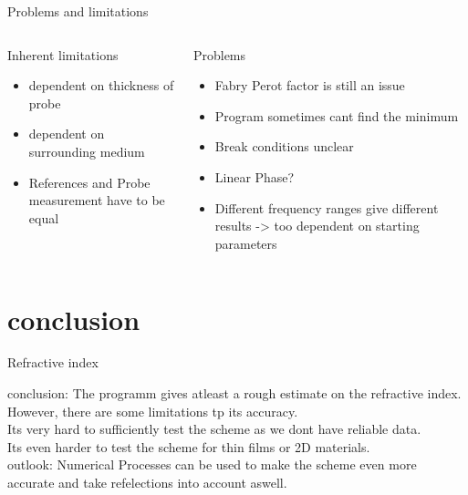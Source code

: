 \documentclass[aspectratio=1610, 9pt]{beamer}
\begin{document}
\begin{frame}{Problems and limitations}
  \begin{columns}
    \begin{column}{0.5\textwidth}
      Inherent limitations
      \begin{itemize}
        \item dependent on thickness of probe
        \item dependent on surrounding medium
        \item References and Probe measurement have to be equal
      \end{itemize}
    \end{column} 
    \begin{column}{0.5\textwidth}
      Problems
      \begin{itemize}
        \item Fabry Perot factor is still an issue
        \item Program sometimes cant find the minimum
        \item Break conditions unclear 
        \item Linear Phase?
        \item Different frequency ranges give different results -> too dependent on starting parameters 
      \end{itemize}
    \end{column}
  \end{columns}
\end{frame}

\section{conclusion}
\begin{frame}{Refractive index}
  \begin{center}
  \textcolor{tugreen}{conclusion:}
    The programm gives atleast a rough estimate on the refractive index. However, there are some limitations tp its accuracy.\\
    Its very hard to sufficiently test the scheme as we dont have reliable data.\\
    Its even harder to test the scheme for thin films or 2D materials.\\
  \textcolor{tugreen}{outlook:}
  Numerical Processes can be used to make the scheme even more accurate and take refelections into account aswell.
\end{center}
\end{frame}
\end{document}
